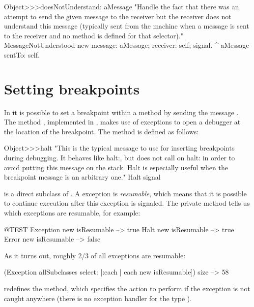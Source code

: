\documentclass[a4paper,10pt,twoside]{book}
\begin{document}
\begin{code}{}
Object>>>doesNotUnderstand: aMessage 
	 "Handle the fact that there was an attempt to send the given message to the receiver but the receiver does not understand this message (typically sent from the machine when a message is sent to the receiver and no method is defined for that selector)."
	MessageNotUnderstood new 
		message: aMessage;
		receiver: self;
		signal.
	^ aMessage sentTo: self.
\end{code}

\section{Setting breakpoints}

In \st it is possible to set a breakpoint within a method by sending the message . The method , implemented in , makes use of exceptions to open a debugger at the location of the breakpoint.
The method  is defined as follows:

\begin{code}{}
Object>>>halt
	"This is the typical message to use for inserting breakpoints during 
	debugging. It behaves like halt:, but does not call on halt: in order to 
	avoid putting this message on the stack. Halt is especially useful when 
	the breakpoint message is an arbitrary one."
	Halt signal
\end{code}

 is a direct subclass of . A  exception is \emph{resumable}, which means that it is possible to continue execution after this exception is signaled. The private  method  tells us which exceptions are resumable, for example:
\begin{code}{@TEST}
Exception new isResumable --> true
Halt new isResumable          --> true
Error new isResumable         --> false
\end{code}

As it turns out, roughly 2/3 of all exceptions are resumable:
\begin{code}{}
(Exception allSubclasses select: [:each | each new isResumable]) size --> 58
\end{code}

 redefines the  method, which specifies the action to perform if the exception is not caught anywhere (\ie there is no exception handler for the type ).
\end{document}
